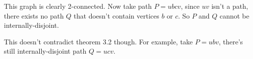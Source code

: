 \documentclass[11pt]{article}
\newcommand{\n}{\vspace{0.3cm}}
\begin{document}
\begin{itemize}
\begin{center}
      \end{center}
      This graph is clearly 2-connected.  Now take path \(P = ubcv\), since \(uv\) isn't a path, there exists no path \(Q\) that doesn't contain vertices \(b\) or \(c\).  So \(P\) and \(Q\) cannot be internally-disjoint. \n

      This doesn't contradict theorem 3.2 though.  For example, take \(P = ubv\), there's still internally-disjoint path \(Q = ucv\).

\end{itemize}
\end{document}
